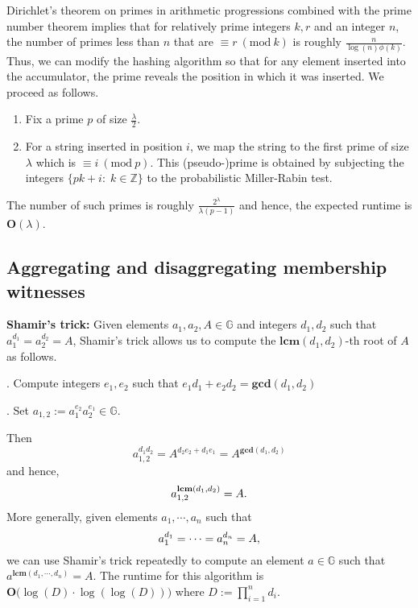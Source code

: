 \documentclass[11pt, lettersize, notitlepage, leqno, footskip=0.6cm]{article}
\newcommand{\bz}{\mathbb Z}
\newcommand{\bG}{\mathbb{G}}
\newcommand{\mb}{\mathbb}
\newcommand{\mbf}{\mathbf}
\newcommand{\lam}{\lambda}
\newcommand{\vs}{\vspace{-0.15cm}}
\newcommand{\noin}{\noindent}
\newcommand{\Mod}[1]{\ (\mathrm{mod}\ #1)}
\newcommand{\LCM}{\mbf{lcm}}
\newcommand{\GCD}{\mbf{gcd}}
\numberwithin{equation}{section}
\begin{document}
Dirichlet's theorem on primes in arithmetic progressions combined with the prime number theorem implies that for relatively prime integers $k,r$ and an integer $n$, the number of primes less than $n$ that are $\equiv r\Mod{k}$ is roughly $\frac{n}{\log(n)\phi(k)}$. Thus, we can modify the hashing algorithm so that for any element inserted into the accumulator, the prime reveals the position in which it was inserted. We proceed as follows.\begin{enumerate}[wide, labelwidth=!, labelindent=0pt]\vspace{-0.1cm} 

\item Fix a prime $p$ of size $\frac{\lam}{2}$. \vs 

\item For a string inserted in position $i$, we map the string to the first prime of size $\lam$ which is $\equiv i\Mod{p}$. This (pseudo-)prime is obtained by subjecting the integers $\{pk+i:\;k\in\bz\}$ to the probabilistic Miller-Rabin test. \end{enumerate} 

\noin The number of such primes is roughly \vs $\frac{2^{\lam}}{\lam (p-1)}$ and hence, the expected runtime is $\mbf{O}(\lam)$.






\subsection{\fontsize{11}{11}\selectfont Aggregating and disaggregating membership witnesses}

\noin \textbf{Shamir's trick:} Given elements $a_1, a_2, A\in \mb{G}$ and integers $d_1, d_2$ such that $a_1^{d_1} = a_2^{d_2} = A$, Shamir's trick allows us to compute the $\LCM(d_1, d_2)$-th root of $A$ as follows.\vspace{0.1cm}

\noin 1. Compute integers $e_1, e_2$ such that $e_1d_1+e_2d_2 = \GCD(d_1, d_2)$

\noin 2. Set $a_{1,2}:= a_1^{e_2}a_2^{e_1} \in \bG$. 

\noin Then \vspace{-0.15cm}$$a_{1,2}^{d_1d_2} = A^{d_2e_2 + d_1e_1} = A^{\GCD(d_1,d_2)}$$ and hence, \vs $$a_{1,2}^{\LCM(d_1,d_2)} = A. \vs $$ More generally, given elements $a_1,\cdots,a_n$ such that \vs $$a_1^{d_1} = \cdots = a_n^{d_n} = A, \vs $$ we can use Shamir's trick repeatedly to compute an element $a\in\mb{G}$ such that $a^{\LCM(d_1,\cdots,d_n)} = A.$ The runtime for this algorithm is $\mbf{O}\big(\log(D)\cdot \log(\log(D))\big)$ where $D:= \prod_{i=1}^n d_i$.
\end{document}
